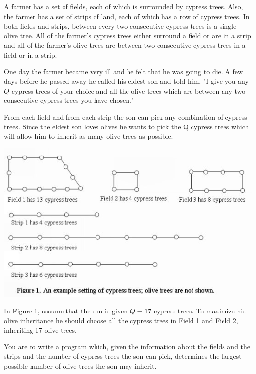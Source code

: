 A farmer has a set of fields, each of which is surrounded by cypress trees. Also, the farmer has a set of strips of land, each of which has a row of cypress trees. In both fields and strips, between every two consecutive cypress trees is a single olive tree. All of the farmer's cypress trees either surround a field or are in a strip and all of the farmer's olive trees are between two consecutive cypress trees in a field or in a strip. 

One day the farmer became very ill and he felt that he was going to die. A few days before he passed away he called his eldest son and told him, "I give you any $Q$ cypress trees of your choice and all the olive trees which are between any two consecutive cypress trees you have chosen." 

From each field and from each strip the son can pick any combination of cypress trees. Since the eldest son loves olives he wants to pick the Q cypress trees which will allow him to inherit as many olive trees as possible. 

\includegraphics{cypress.jpg}

In Figure 1, assume that the son is given $Q=17$ cypress trees. To maximize his olive inheritance he should choose all the cypress trees in Field 1 and Field 2, inheriting 17 olive trees. 

You are to write a program which, given the information about the fields and the strips and the number of cypress trees the son can pick, determines the largest possible number of olive trees the son may inherit.  